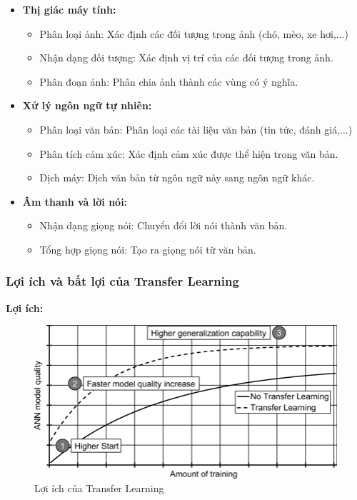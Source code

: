 \begin{itemize}
    \item \textbf{Thị giác máy tính:} 
        \begin{itemize}
            \item Phân loại ảnh: Xác định các đối tượng trong ảnh (chó, mèo, xe hơi,...)
            \item Nhận dạng đối tượng: Xác định vị trí của các đối tượng trong ảnh.
            \item Phân đoạn ảnh: Phân chia ảnh thành các vùng có ý nghĩa.
        \end{itemize}
    \item \textbf{Xử lý ngôn ngữ tự nhiên:}
        \begin{itemize}
            \item Phân loại văn bản: Phân loại các tài liệu văn bản (tin tức, đánh giá,...)
            \item Phân tích cảm xúc: Xác định cảm xúc được thể hiện trong văn bản.
            \item Dịch máy: Dịch văn bản từ ngôn ngữ này sang ngôn ngữ khác.
        \end{itemize}
    \item \textbf{Âm thanh và lời nói:}
        \begin{itemize}
            \item Nhận dạng giọng nói: Chuyển đổi lời nói thành văn bản.
            \item Tổng hợp giọng nói: Tạo ra giọng nói từ văn bản.
        \end{itemize}
\end{itemize}

\subsubsection{Lợi ích và bất lợi của Transfer Learning}

\textbf{Lợi ích:}

 \begin{figure}[H]
    \centering
    \includegraphics[scale = 0.5]{Images/Theoretical basis/Possible-advantages-of-transfer-learning.png}
\caption{Lợi ích của Transfer Learning}
\end{figure}


